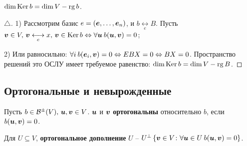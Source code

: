 







\begin{to_thr} 
	$\dim \mathop{\mathrm{Ker}}\nolimits b = \dim V - \mathop{\mathrm{rg}}\nolimits b$.
\end{to_thr}

\begin{proof}[$\triangle$]
	1) Рассмотрим базис $e = (\mbox{\boldmath $e$},\ldots,\mbox{\boldmath $e$}_n)$, и $b \underset{e}{\longleftrightarrow} B$. Пусть $\mbox{\boldmath $v$}\in V, \, \mbox{\boldmath $v$} \underset{e}{\longleftrightarrow} x, \, \mbox{\boldmath $v$} \in \mathop{\mathrm{Ker}}\nolimits b \Leftrightarrow \forall \mbox{\boldmath $u$} \: b(\mbox{\boldmath $u$},\mbox{\boldmath $v$}) = 0$;

	2) Или равносильно: $\forall i \: b(\mbox{\boldmath $e$}_i, \mbox{\boldmath $v$}) = 0 \Leftrightarrow E B X = 0 \Leftrightarrow B X = 0$. Пространство решений это ОСЛУ имеет требуемое равенство: $\dim \mathop{\mathrm{Ker}}\nolimits b = \dim V - \mathop{\mathrm{rg}}\nolimits B$.
\end{proof}

\subsection{Ортогональные и невырожденные}
\begin{to_def} 
	Пусть $b \in \mathcal{B}^{\pm}(V), \, \mbox{\boldmath $u$},\mbox{\boldmath $v$} \in V$. $\mbox{\boldmath $u$}$ и $\mbox{\boldmath $v$}$ \textbf{ортогональны} относительно $b$, если $b(\mbox{\boldmath $u$},\mbox{\boldmath $v$}) = 0$. 

	Для $U \subseteq V$, \textbf{ортогональное дополнение} $U$ -- $U^\bot \left\{ \mbox{\boldmath $v$} \in V \colon \forall \mbox{\boldmath $u$} \in U \: b(\mbox{\boldmath $u$},\mbox{\boldmath $v$}) = 0\right\}$.
\end{to_def}

